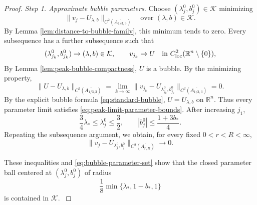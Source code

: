\documentclass[11pt]{article}
\numberwithin{equation}{section}
\theoremstyle{remark}
\newcommand{\R}{\mathbb R}
\newcommand{\norm}[1]{\lVert #1\rVert}
\begin{document}
\begin{proof}
\emph{Step 1. Approximate bubble parameters.}
Choose \((\lambda_j^0,b_j^0)\in\mathcal K\) minimizing
\[
 \norm{v_j-U_{\lambda,b}}_{C^2(\overline{A_{1/3,3}})}
 \quad\text{over }(\lambda,b)\in\mathcal K.
\]
{By Lemma  \ref{lem:distance-to-bubble-family}, this minimum tends
to zero.}
Every subsequence has a further subsequence such that
\[
 (\lambda_{j_k}^0,b_{j_k}^0)\to(\lambda,b)\in\mathcal K,
 \qquad
 v_{j_k}\to U
 \quad\text{in }C^2_{\rm loc}(\R^n\setminus\{0\}),
\]
{By Lemma  \ref{lem:peak-bubble-compactness}, \(U\) is a bubble.}
{By the minimizing property,}
\[
 \|U-U_{\lambda,b}\|_{C^2(\overline{A_{1/3,3}})}
 =\lim_{k\to\infty}
 \|v_{j_k}-U_{\lambda_{j_k}^0,b_{j_k}^0}\|_{C^2(\overline{A_{1/3,3}})}
 =0.
\]
{By the explicit bubble formula
\eqref{eq:standard-bubble}, \(U=U_{\lambda,b}\) on \(\R^n\).}
Thus every parameter limit satisfies \eqref{eq:peak-limit-parameter-bounds}.
{After increasing \(j_1\),}
\[
 \frac34\lambda_*\le\lambda_j^0\le\frac32,\qquad
 |b_j^0|\le\frac{1+3b_*}{4}.
\]
{Repeating the subsequence argument, we obtain, for every fixed
\(0<r<R<\infty\),}
\[
 \|v_j-U_{\lambda_j^0,b_j^0}\|_{C^2(\overline{A_{r,R}})}
 \to0.
\]

{
These inequalities and \eqref{eq:bubble-parameter-set} show that the closed
parameter ball centered at \((\lambda_j^0,b_j^0)\) of radius
\[
 \frac18\min\{\lambda_*,1-b_*,1\}
\]
is contained in \(\mathcal K\).
}


\end{proof}
\end{document}
